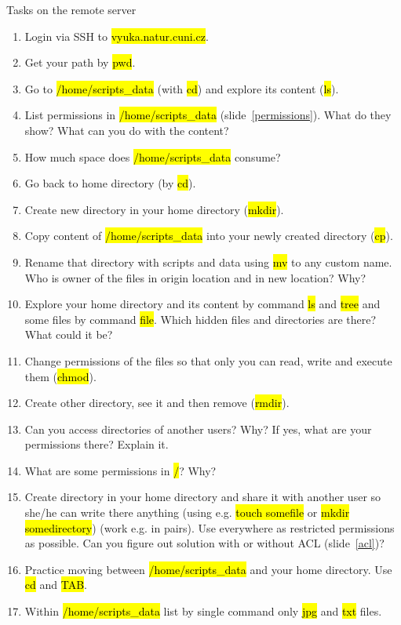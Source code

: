 \documentclass[compress, ucs, xelatex, 11pt, xcolor=svgnames, aspectratio=169,
	hyperref={
		bookmarks=true,
		unicode=true,
		colorlinks=true,
		pdftitle={Linux, command line and MetaCentrum},
		plainpages=false,
		pdfauthor={Vojtech Zeisek},
		pdfsubject={Course about use of Linux command line, writing shell scripts and using MetaCentrum of CESNET},
		pdfcreator={XeLaTeX},
		pdfkeywords={Linux, GNU, BASH, shell, command line, MetaCentrum},
		linkcolor=DarkRed, %
		anchorcolor=DarkBlue, %
		citecolor=Indigo, %
		filecolor=NavyBlue, %
		menucolor=DarkMagenta, %
		urlcolor=DarkBlue, %
		pdftex},
	url={hyphens, lowtilde} %
	]{beamer}
\renewcommand{\texttt}[1]{\hl{\ttfamily #1}}
\begin{document}
\begin{frame}[allowframebreaks]{Tasks on the remote server}
	\begin{enumerate}
		\item Login via SSH to \texttt{vyuka.natur.cuni.cz}.
		\item Get your path by \texttt{pwd}.
		\item Go to \texttt{/home/scripts\_data} (with \texttt{cd}) and explore its content (\texttt{ls}).
		\item List permissions in \texttt{/home/scripts\_data} (slide~\ref{permissions}). What do they show? What can you do with the content?
		\item How much space does \texttt{/home/scripts\_data} consume?
		\item Go back to home directory (by \texttt{cd}).
		\item Create new directory in your home directory (\texttt{mkdir}).
		\item Copy content of \texttt{/home/scripts\_data} into your newly created directory (\texttt{cp}).
		\item Rename that directory with scripts and data using \texttt{mv} to any custom name. Who is owner of the files in origin location and in new location? Why?
		\item Explore your home directory and its content by command \texttt{ls} and \texttt{tree} and some files by command \texttt{file}. Which hidden files and directories are there? What could it be?
		\item Change permissions of the files so that only you can read, write and execute them (\texttt{chmod}).
		\item Create other directory, see it and then remove (\texttt{rmdir}).
		\item Can you access directories of another users? Why? If yes, what are your permissions there? Explain it.
		\item What are some permissions in \texttt{/}? Why?
		\item Create directory in your home directory and share it with another user so she/he can write there anything (using e.g. \texttt{touch somefile} or \texttt{mkdir somedirectory}) (work e.g. in pairs). Use everywhere as restricted permissions as possible. Can you figure out solution with or without ACL (slide~\ref{acl})?
		\item Practice moving between \texttt{/home/scripts\_data} and your home directory. Use \texttt{cd} and \texttt{TAB}.
		\item Within \texttt{/home/scripts\_data} list by single command only \texttt{jpg} and \texttt{txt} files.
	\end{enumerate}
\end{frame}
\end{document}
